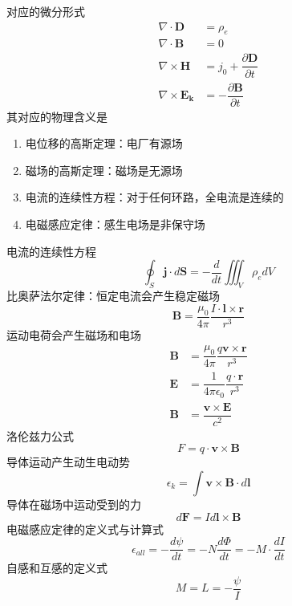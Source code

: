 对应的微分形式
\begin{align}
    \nabla \cdot \bm{D}&=\rho _e\\
    \nabla \cdot \bm{B}&=0\\
    \nabla \times \bm{H}&=j_0+\dfrac{\partial \bm{D}}{\partial t}\\
    \nabla \times \bm{E_k}&=-\dfrac{\partial \bm{B}}{\partial t}
\end{align}
其对应的物理含义是
\begin{enumerate}
    \item 电位移的高斯定理：电厂有源场
    \item 磁场的高斯定理：磁场是无源场
    \item 电流的连续性方程：对于任何环路，全电流是连续的
    \item 电磁感应定律：感生电场是非保守场
\end{enumerate}
电流的连续性方程
\begin{equation}
    \oint_S\bm{j}\cdot d\bm{S}=-\dfrac{d}{dt}\iiint _V\rho_e dV
\end{equation}
比奥萨法尔定律：恒定电流会产生稳定磁场
\begin{equation}
    \bm{B}=\dfrac{\mu_0}{4\pi}\dfrac{I \cdot \bm{l}\times \bm{r}}{r^3}
\end{equation}
运动电荷会产生磁场和电场
\begin{align}
    \bm{B}&=\dfrac{\mu_0}{4\pi}\dfrac{q \bm{v}\times \bm{r}}{r^3}\\
    \bm{E}&=\dfrac{1}{4\pi \epsilon_0}\dfrac{q \cdot \bm{r}}{r^3}\\
    \bm{B}&=\dfrac{\bm{v}\times \bm{E}}{c^2}
\end{align}
洛伦兹力公式
\begin{equation}
    F=q\cdot \bm{v}\times \bm{B}
\end{equation}
导体运动产生动生电动势
\begin{equation}
    \epsilon_k=\int \bm{v}\times \bm{B}\cdot d\bm{l}
\end{equation}
导体在磁场中运动受到的力
\begin{equation}
    d\bm{F}=Id\bm{l}\times \bm{B}
\end{equation}
电磁感应定律的定义式与计算式
\begin{equation}
    \epsilon_{all}=-\dfrac{d\psi }{dt}=-N\dfrac{d\varPhi }{dt}=-M\cdot \dfrac{dI}{dt}
\end{equation}
自感和互感的定义式
\begin{equation}
    M=L=-\dfrac{\psi }{I}
\end{equation}
